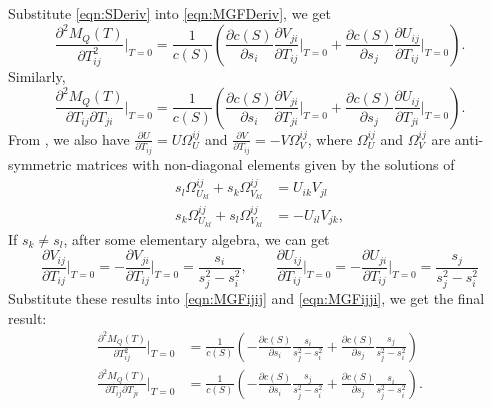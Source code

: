 \documentclass[10pt]{article}
\begin{document}
Substitute \eqref{eqn:SDeriv} into \eqref{eqn:MGFDeriv}, we get
\begin{equation} \label{eqn:MGFijij}
	\frac{\partial^2 M_Q(T)}{\partial T_{ij}^2}\bigg|_{T=0} = \frac{1}{c(S)}\left(\frac{\partial c(S)}{\partial s_i}\frac{\partial V_{ji}}{\partial T_{ij}}\bigg|_{T=0} + \frac{\partial c(S)}{\partial s_j}\frac{\partial U_{ij}}{\partial T_{ij}}\bigg|_{T=0}\right).
\end{equation}
Similarly,
\begin{equation} \label{eqn:MGFijji}
	\frac{\partial^2 M_Q(T)}{\partial T_{ij}\partial T_{ji}}\bigg|_{T=0} = \frac{1}{c(S)}\left(\frac{\partial c(S)}{\partial s_i}\frac{\partial V_{ji}}{\partial T_{ji}}\bigg|_{T=0} + \frac{\partial c(S)}{\partial s_j}\frac{\partial U_{ij}}{\partial T_{ji}}\bigg|_{T=0}\right).
\end{equation}
From \cite{papadopoulo2000estimating}, we also have $\frac{\partial U}{\partial T_{ij}} = U\Omega_U^{ij}$ and $\frac{\partial V}{\partial T_{ij}} = -V\Omega_V^{ij}$, where $\Omega_U^{ij}$ and $\Omega_V^{ij}$ are anti-symmetric matrices with non-diagonal elements given by the solutions of
\begin{align}
	s_l\Omega_{U_{kl}}^{ij} + s_k\Omega_{V_{kl}}^{ij} &= U_{ik}V_{jl} \nonumber \\
	s_k\Omega_{U_{kl}}^{ij} + s_l\Omega_{V_{kl}}^{ij} &= -U_{il}V_{jk},
\end{align}
If $s_k \neq s_l$, after some elementary algebra, we can get
\begin{equation}
	\frac{\partial V_{ij}}{\partial T_{ij}}\big|_{T=0} = -\frac{\partial V_{ji}}{\partial T_{ij}}\big|_{T=0} = \frac{s_i}{s_j^2-s_i^2}, \qquad
	\frac{\partial U_{ij}}{\partial T_{ij}}\big|_{T=0} = -\frac{\partial U_{ji}}{\partial T_{ij}}\big|_{T=0} = \frac{s_j}{s_j^2-s_i^2}
\end{equation}
Substitute these results into \eqref{eqn:MGFijij} and \eqref{eqn:MGFijji}, we get the final result:
\begin{align} \label{eqn:secondMoments}
	\frac{\partial^2 M_Q(T)}{\partial T_{ij}^2}\bigg|_{T=0} &= \frac{1}{c(S)}\left(-\frac{\partial c(S)}{\partial s_i}\frac{s_i}{s_j^2-s_i^2}+\frac{\partial c(S)}{\partial s_j}\frac{s_j}{s_j^2-s_i^2}\right) \nonumber \\
	\frac{\partial^2 M_Q(T)}{\partial T_{ij}\partial T_{ji}}\bigg|_{T=0} &= \frac{1}{c(S)}\left(-\frac{\partial c(S)}{\partial s_i}\frac{s_j}{s_j^2-s_i^2}+\frac{\partial c(S)}{\partial s_j}\frac{s_i}{s_j^2-s_i^2}\right).
\end{align}
\end{document}
